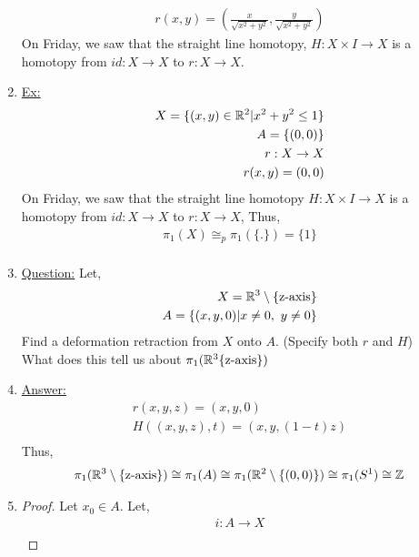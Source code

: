 \begin{enumerate}
\begin{align*}
            r(x,y)=(\frac{x}{\sqrt{x^2+y^2}},\frac{y}{\sqrt{x^2+y^2}})
        \end{align*}
        On Friday, we saw that the straight line homotopy, $H:X\times I\rightarrow X$
        is a homotopy from $id:X\rightarrow X$ to $r:X\rightarrow X$.
    \item \underline{Ex:}
        \begin{align*}
            X=\{(x,y)\in \mathbb{R}^2| x^2+y^2\leq 1\}\\
            A=\{(0,0)\}\\
            r: X\rightarrow X\\
            r(x,y)=(0,0)\\
        \end{align*}
        On Friday, we saw that the straight line homotopy $H:X\times I \rightarrow X$ is
        a homotopy from $id:X\rightarrow X$ to $r:X\rightarrow X$,
        Thus,
        \begin{align*}
            \pi_1(X)\cong_{p}\pi_1(\{.\})=\{1\}\\
        \end{align*}
    \item \underline{Question:} Let,
        \begin{align*}
            X=\mathbb{R}^3\setminus \{\text{z-axis}\}\\
            A=\{(x,y,0)| x\neq 0,\ y\neq 0\}\\
        \end{align*}
        Find a deformation retraction from $X$ onto $A$. (Specify both $r$ and $H$)\\
        What does this tell us about $\pi_1(\mathbb{R}^3\{\text{z-axis}\})$
    \item \underline{Answer:}
        \begin{align*}
            r(x,y,z)=(x,y,0)\\
            H((x,y,z),t)=(x,y, (1-t)z)\\
        \end{align*}
        Thus,
        \begin{align*}
            \pi_1(\mathbb{R}^3\setminus\{\text{z-axis}\})\cong \pi_1(A)\cong \pi_1(\mathbb{R}^2\setminus\{(0,0)\})\cong \pi_1(S^1)\cong \mathbb{Z}\\
        \end{align*}
    \item \begin{proof} Let $x_0\in A$. Let,
            \begin{align*}
                i: A\rightarrow X\\

\end{align*}
\end{proof}
\end{enumerate}
